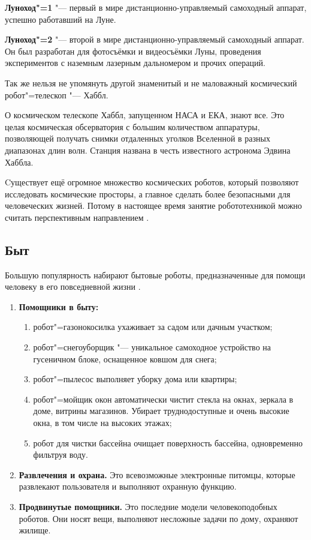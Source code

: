 \documentclass[bachelor, och, referat]{SCWorks}
\begin{document}
\textbf{Луноход"=1} "--- первый в мире дистанционно-управляемый самоходный аппарат, успешно работавший на Луне. 

\textbf{Луноход"=2} "--- второй в мире дистанционно-управляемый самоходный аппарат. Он был разработан для фотосъёмки и видеосъёмки Луны, проведения экспериментов с наземным лазерным дальномером и прочих операций.

Так же нельзя не упомянуть другой знаменитый и не маловажный космический робот"=телескоп "--- Хаббл.

О космическом телескопе Хаббл, запущенном НАСА и ЕКА, знают все. Это целая космическая обсерватория с большим количеством аппаратуры, позволяющей получать снимки отдаленных уголков Вселенной в разных диапазонах длин волн. Станция названа в честь известного астронома Эдвина Хаббла.

Cуществует ещё огромное множество космических роботов, который позволяют исследовать космические просторы, а главное сделать более безопасными для человеческих жизней. Потому в настоящее время занятие робототехникой можно считать перспективным направлением \cite{8}.

\subsection{Быт}

Большую популярность набирают бытовые роботы, предназначенные для помощи человеку в его повседневной жизни \cite{9}.

\begin{enumerate}
    \item \textbf{Помощники в быту:}
    \begin{enumerate}
        \item робот"=газонокосилка ухаживает за садом или дачным участком;
        \item робот"=снегоуборщик "--- уникальное самоходное устройство на гусеничном блоке, оснащенное ковшом для снега;
        \item робот"=пылесос выполняет уборку дома или квартиры;
        \item робот"=мойщик окон автоматически чистит стекла на окнах, зеркала в доме, витрины магазинов. Убирает труднодоступные и очень высокие окна, в том числе на высоких этажах;
        \item робот для чистки бассейна очищает поверхность бассейна, одновременно фильтруя воду.
    \end{enumerate}
    \item \textbf{Развлечения и охрана.} Это всевозможные электронные питомцы, которые развлекают пользователя и выполняют охранную функцию.
    \item \textbf{Продвинутые помощники.} Это последние модели человекоподобных роботов. Они носят вещи, выполняют несложные задачи по дому, охраняют жилище.
\end{enumerate}
\end{document}
